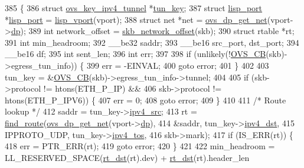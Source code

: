 \begin{DoxyCode}
385 \{
386     \textcolor{keyword}{struct }\hyperlink{structovs__key__ipv4__tunnel}{ovs\_key\_ipv4\_tunnel} *\hyperlink{flow_8h_a904e9497acde49a1992636f77597c5c7}{tun\_key};
387     \textcolor{keyword}{struct }\hyperlink{structlisp__port}{lisp\_port} *\hyperlink{structlisp__port}{lisp\_port} = \hyperlink{linux_2vport-lisp_8c_af8f69fb0b9db12e9a324a9932011b302}{lisp\_vport}(vport);
388     \textcolor{keyword}{struct }net *net = \hyperlink{datapath_8h_aef2302004ca1f45133eaef00bb3740eb}{ovs\_dp\_get\_net}(vport->\hyperlink{structvport_a49fb6f6bf0ac4337853e9242e88ddc42}{dp});
389     \textcolor{keywordtype}{int} network\_offset = \hyperlink{skbuff_8h_aabe75b44039b11c1b7c6e2f246e7146e}{skb\_network\_offset}(skb);
390     \textcolor{keyword}{struct }rtable *rt;
391     \textcolor{keywordtype}{int} min\_headroom;
392     \_\_be32 saddr;
393     \_\_be16 src\_port, dst\_port;
394     \_\_be16 df;
395     \textcolor{keywordtype}{int} sent\_len;
396     \textcolor{keywordtype}{int} err;
397 
398     \textcolor{keywordflow}{if} (unlikely(!\hyperlink{datapath_8h_ac337c4d4ddca29916ce8e900038ddd78}{OVS\_CB}(skb)->egress\_tun\_info)) \{
399         err = -EINVAL;
400         \textcolor{keywordflow}{goto} error;
401     \}
402 
403     tun\_key = &\hyperlink{datapath_8h_ac337c4d4ddca29916ce8e900038ddd78}{OVS\_CB}(skb)->egress\_tun\_info->tunnel;
404 
405     \textcolor{keywordflow}{if} (skb->protocol != htons(ETH\_P\_IP) &&
406         skb->protocol != htons(ETH\_P\_IPV6)) \{
407         err = 0;
408         \textcolor{keywordflow}{goto} error;
409     \}
410 
411     \textcolor{comment}{/* Route lookup */}
412     saddr = tun\_key->\hyperlink{structovs__key__ipv4__tunnel_a1e5a978f104d61e9694e914a109734a7}{ipv4\_src};
413     rt = \hyperlink{compat_8h_a9fd71ce2d13a3dcc4f7d51469ba86d79}{find\_route}(\hyperlink{datapath_8h_aef2302004ca1f45133eaef00bb3740eb}{ovs\_dp\_get\_net}(vport->\hyperlink{structvport_a49fb6f6bf0ac4337853e9242e88ddc42}{dp}),
414             &saddr, tun\_key->\hyperlink{structovs__key__ipv4__tunnel_ae443d381a97f53bbc4139fe36c0aae30}{ipv4\_dst},
415             IPPROTO\_UDP, tun\_key->\hyperlink{structovs__key__ipv4__tunnel_a69594eaf9d7dfc2824b264484e02498e}{ipv4\_tos},
416             skb->mark);
417     \textcolor{keywordflow}{if} (IS\_ERR(rt)) \{
418         err = PTR\_ERR(rt);
419         \textcolor{keywordflow}{goto} error;
420     \}
421 
422     min\_headroom = LL\_RESERVED\_SPACE(\hyperlink{compat_8h_afce1864ee37be971c99555fdf1f76d88}{rt\_dst}(rt).dev) + \hyperlink{compat_8h_afce1864ee37be971c99555fdf1f76d88}{rt\_dst}(rt).header\_len

\end{DoxyCode}
